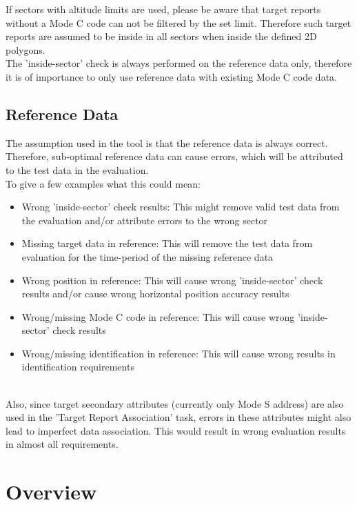 If sectors with altitude limits are used, please be aware that target reports without a Mode C code can not be filtered by the set limit. Therefore such target reports are assumed to be inside in all 
sectors when inside the defined 2D polygons. \\

The 'inside-sector' check is always performed on the reference data only, therefore it is of importance to only use reference data with existing Mode C code data.

\subsection{Reference Data}

The assumption used in the tool is that the reference data is always correct. Therefore, sub-optimal reference data can cause errors, which will be attributed to the test data in the evaluation. \\

To give a few examples what this could mean:
\begin{itemize}  
\item Wrong 'inside-sector' check results: This might remove valid test data from the evaluation and/or attribute errors to the wrong sector
\item Missing target data in reference: This will remove the test data from evaluation for the time-period of the missing reference data
\item Wrong position in reference: This will cause wrong 'inside-sector' check results and/or cause wrong horizontal position accuracy results
\item Wrong/missing Mode C code in reference: This will cause wrong 'inside-sector' check results
\item Wrong/missing identification in reference: This will cause wrong results in identification requirements
\end{itemize}
\ \\

Also, since target secondary attributes (currently only Mode S address) are also used in the 'Target Report Association' task, errors in these attributes might also lead to imperfect data association. This would result in wrong evaluation results in almost all requirements.

\section{Overview}
\label{sec:eval_overview} 

